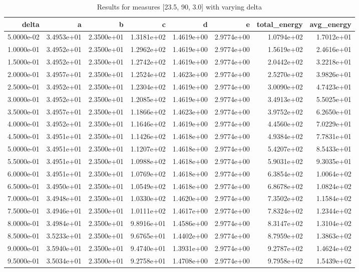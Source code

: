 \begin{table}
\caption{Results for measures [23.5, 90, 3.0] with varying delta}
\label{tab:results_23.5_90_3.0}
\begin{tabular}{rrrrrrrr}
\toprule
delta & a & b & c & d & e & total_energy & avg_energy \\
\midrule
5.0000e-02 & 3.4953e+01 & 2.3500e+01 & 1.3181e+02 & 1.4619e+00 & 2.9774e+00 & 1.0794e+02 & 1.7012e+01 \\
1.0000e-01 & 3.4952e+01 & 2.3500e+01 & 1.2962e+02 & 1.4619e+00 & 2.9774e+00 & 1.5619e+02 & 2.4616e+01 \\
1.5000e-01 & 3.4952e+01 & 2.3500e+01 & 1.2742e+02 & 1.4619e+00 & 2.9774e+00 & 2.0442e+02 & 3.2218e+01 \\
2.0000e-01 & 3.4957e+01 & 2.3500e+01 & 1.2524e+02 & 1.4623e+00 & 2.9774e+00 & 2.5270e+02 & 3.9826e+01 \\
2.5000e-01 & 3.4952e+01 & 2.3500e+01 & 1.2304e+02 & 1.4619e+00 & 2.9774e+00 & 3.0090e+02 & 4.7423e+01 \\
3.0000e-01 & 3.4952e+01 & 2.3500e+01 & 1.2085e+02 & 1.4619e+00 & 2.9774e+00 & 3.4913e+02 & 5.5025e+01 \\
3.5000e-01 & 3.4957e+01 & 2.3500e+01 & 1.1866e+02 & 1.4623e+00 & 2.9774e+00 & 3.9752e+02 & 6.2650e+01 \\
4.0000e-01 & 3.4952e+01 & 2.3500e+01 & 1.1646e+02 & 1.4619e+00 & 2.9774e+00 & 4.4560e+02 & 7.0229e+01 \\
4.5000e-01 & 3.4951e+01 & 2.3500e+01 & 1.1426e+02 & 1.4618e+00 & 2.9774e+00 & 4.9384e+02 & 7.7831e+01 \\
5.0000e-01 & 3.4951e+01 & 2.3500e+01 & 1.1207e+02 & 1.4618e+00 & 2.9774e+00 & 5.4207e+02 & 8.5433e+01 \\
5.5000e-01 & 3.4951e+01 & 2.3500e+01 & 1.0988e+02 & 1.4618e+00 & 2.9774e+00 & 5.9031e+02 & 9.3035e+01 \\
6.0000e-01 & 3.4951e+01 & 2.3500e+01 & 1.0769e+02 & 1.4618e+00 & 2.9774e+00 & 6.3854e+02 & 1.0064e+02 \\
6.5000e-01 & 3.4950e+01 & 2.3500e+01 & 1.0549e+02 & 1.4618e+00 & 2.9774e+00 & 6.8678e+02 & 1.0824e+02 \\
7.0000e-01 & 3.4948e+01 & 2.3500e+01 & 1.0330e+02 & 1.4620e+00 & 2.9774e+00 & 7.3502e+02 & 1.1584e+02 \\
7.5000e-01 & 3.4946e+01 & 2.3500e+01 & 1.0111e+02 & 1.4617e+00 & 2.9774e+00 & 7.8324e+02 & 1.2344e+02 \\
8.0000e-01 & 3.4984e+01 & 2.3500e+01 & 9.8916e+01 & 1.4586e+00 & 2.9774e+00 & 8.3147e+02 & 1.3104e+02 \\
8.5000e-01 & 3.5233e+01 & 2.3500e+01 & 9.6765e+01 & 1.4402e+00 & 2.9774e+00 & 8.7959e+02 & 1.3863e+02 \\
9.0000e-01 & 3.5940e+01 & 2.3500e+01 & 9.4740e+01 & 1.3931e+00 & 2.9774e+00 & 9.2787e+02 & 1.4624e+02 \\
9.5000e-01 & 3.5034e+01 & 2.3500e+01 & 9.2758e+01 & 1.4708e+00 & 2.9774e+00 & 9.7958e+02 & 1.5439e+02 \\
\bottomrule
\end{tabular}
\end{table}
